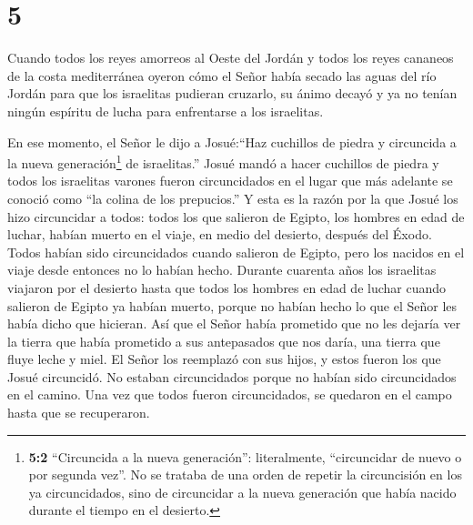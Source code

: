 \hypertarget{section-4}{%
\section{5}\label{section-4}}

 Cuando todos los reyes amorreos al Oeste del Jordán y todos
los reyes cananeos de la costa mediterránea oyeron cómo el Señor había
secado las aguas del río Jordán para que los israelitas pudieran
cruzarlo, su ánimo decayó y ya no tenían ningún espíritu de lucha para
enfrentarse a los israelitas.

 En ese momento, el Señor le dijo a Josué:``Haz cuchillos de
piedra y circuncida a la nueva generación\footnote{\textbf{5:2}
  ``Circuncida a la nueva generación'': literalmente, ``circuncidar de
  nuevo o por segunda vez''. No se trataba de una orden de repetir la
  circuncisión en los ya circuncidados, sino de circuncidar a la nueva
  generación que había nacido durante el tiempo en el desierto.} de
israelitas.''  Josué mandó a hacer cuchillos de piedra y
todos los israelitas varones fueron circuncidados en el lugar que más
adelante se conoció como ``la colina de los prepucios.''  Y
esta es la razón por la que Josué los hizo circuncidar a todos: todos
los que salieron de Egipto, los hombres en edad de luchar, habían muerto
en el viaje, en medio del desierto, después del Éxodo. 
Todos habían sido circuncidados cuando salieron de Egipto, pero los
nacidos en el viaje desde entonces no lo habían hecho. 
Durante cuarenta años los israelitas viajaron por el desierto hasta que
todos los hombres en edad de luchar cuando salieron de Egipto ya habían
muerto, porque no habían hecho lo que el Señor les había dicho que
hicieran. Así que el Señor había prometido que no les dejaría ver la
tierra que había prometido a sus antepasados que nos daría, una tierra
que fluye leche y miel.  El Señor los reemplazó con sus
hijos, y estos fueron los que Josué circuncidó. No estaban circuncidados
porque no habían sido circuncidados en el camino.  Una vez
que todos fueron circuncidados, se quedaron en el campo hasta que se
recuperaron.


